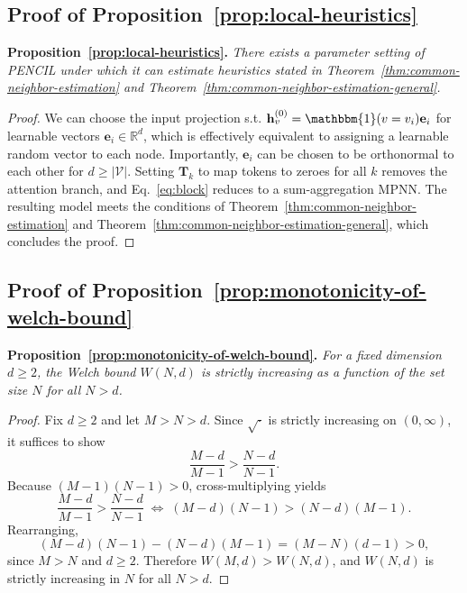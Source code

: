 \documentclass{article}
\theoremstyle{plain}
\theoremstyle{definition}
\theoremstyle{remark}
\begin{document}
\subsection{Proof of Proposition~\ref{prop:local-heuristics}} \label{app:proof_local-heuristics}

\textbf{Proposition~\ref{prop:local-heuristics}.} \textit{
    There exists a parameter setting of PENCIL under which it can estimate heuristics stated in Theorem~\ref{thm:common-neighbor-estimation} and Theorem~\ref{thm:common-neighbor-estimation-general}.
}

\begin{proof}
    We can choose the input projection s.t. $\mathbf{h}_v^{(0)}=\mathbbm{1}(v=v_i)\mathbf{e}_i$ for learnable vectors $\mathbf{e}_i\in\mathbb{R}^d$, which is effectively equivalent to assigning a learnable random vector to each node. Importantly, \(\mathbf{e}_{i}\) can be chosen to be orthonormal to each other for \(d \ge |\mathcal{V}|\). Setting $\mathbf{T}_k$ to map tokens to zeroes for all $k$ removes the attention branch, and Eq.~\ref{eq:block} reduces to a sum-aggregation MPNN. The resulting model meets the conditions of Theorem~\ref{thm:common-neighbor-estimation} and Theorem~\ref{thm:common-neighbor-estimation-general}, which concludes the proof.
\end{proof}

\subsection{Proof of Proposition~\ref{prop:monotonicity-of-welch-bound}} \label{app:proof_monotonicity-of-welch-bound-proposition}

\textbf{Proposition~\ref{prop:monotonicity-of-welch-bound}.} \textit{
    For a fixed dimension $d \ge 2$, the Welch bound $W(N,d)$ is strictly increasing as a function of the set size $N$ for all $N > d$.
}

\begin{proof}
    Fix \(d\ge 2\) and let \(M>N>d\). Since \(\sqrt{\cdot}\) is strictly increasing on \((0,\infty)\), it suffices to show
    \[
    \frac{M-d}{M-1}>\frac{N-d}{N-1}.
    \]
    Because \((M-1)(N-1)>0\), cross-multiplying yields
    \[
    \frac{M-d}{M-1}>\frac{N-d}{N-1}
    \;\Longleftrightarrow\;
    (M-d)(N-1)>(N-d)(M-1).
    \]
    Rearranging,
    \[
    (M-d)(N-1)-(N-d)(M-1)=(M-N)(d-1)>0,
    \]
    since \(M>N\) and \(d\ge 2\). Therefore \(W(M,d)>W(N,d)\), and \(W(N,d)\) is strictly increasing in \(N\) for all \(N>d\).
\end{proof}
\end{document}
